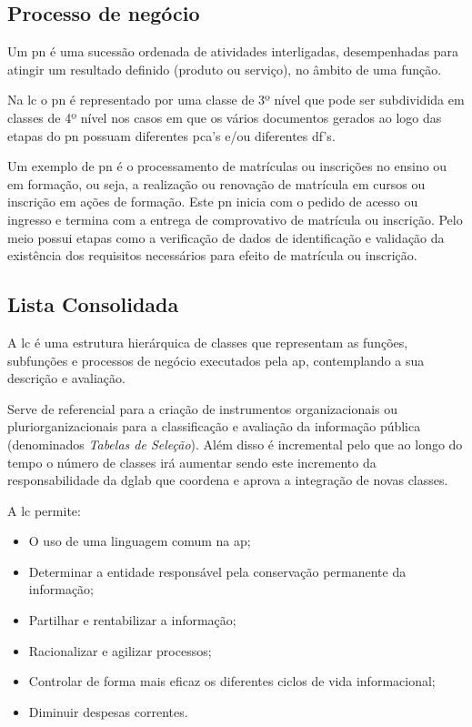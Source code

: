 \subsection{Processo de negócio}
Um \acrfull{pn} é uma sucessão ordenada de atividades interligadas, desempenhadas para atingir um resultado 
definido (produto ou serviço), no âmbito de uma função.~\cite{procNeg}

Na \acrshort{lc} o \acrshort{pn} é representado por uma classe de 3º nível que pode ser subdividida em classes de 
4º nível 
nos casos em que os vários documentos gerados ao logo das etapas do \acrlong{pn} possuam diferentes \acrshort{pca}'s 
e/ou diferentes \acrshort{df}'s.

Um exemplo de \acrshort{pn} é o processamento de matrículas ou inscrições no ensino ou em formação, ou seja, a 
realização ou renovação de matrícula em cursos ou inscrição em ações de formação. 
Este \acrshort{pn} inicia com o pedido de acesso ou ingresso e termina com a entrega de comprovativo de matrícula 
ou inscrição. Pelo meio possui etapas como a verificação de dados de identificação e validação da existência 
dos requisitos necessários para efeito de matrícula ou inscrição.

\subsection{Lista Consolidada}

A \acrfull{lc} é uma estrutura hierárquica de classes que representam as funções, subfunções e processos de 
negócio executados pela \acrfull{ap}, contemplando a sua descrição e avaliação.~\cite{lc}

Serve de referencial para a criação de instrumentos organizacionais ou pluriorganizacionais para a classificação e 
avaliação da informação pública (denominados \emph{Tabelas de Seleção}). 
Além disso é incremental pelo que ao longo do tempo o número de classes irá aumentar sendo este incremento da 
responsabilidade da \acrshort{dglab} que coordena e aprova a integração de novas classes.

A \acrshort{lc} permite:~\cite{lc}
\begin{itemize}
    \item O uso de uma linguagem comum na \acrshort{ap};
    \item Determinar a entidade responsável pela conservação permanente da informação;
    \item Partilhar e rentabilizar a informação;
    \item Racionalizar e agilizar processos;
    \item Controlar de forma mais eficaz os diferentes ciclos de vida informacional;
    \item Diminuir despesas correntes.
\end{itemize}

